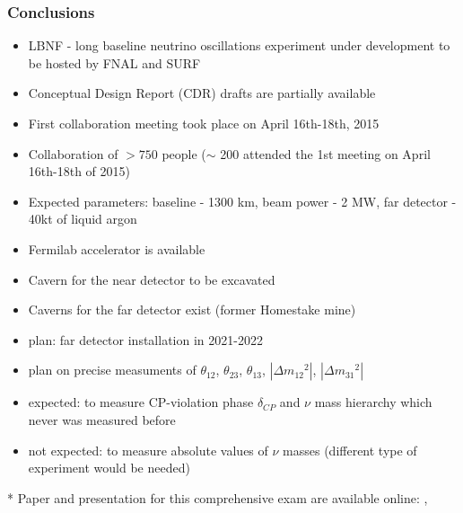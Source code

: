 \documentclass{beamer}
\begin{document}
\begin{frame}\frametitle{Conclusions}
  \scriptsize
  \begin{itemize}

     \item LBNF - long baseline neutrino oscillations experiment under development to be hosted by FNAL and SURF 
     \item Conceptual Design Report (CDR) drafts are partially available
     \item First collaboration meeting took place on April 16th-18th, 2015
     \item Collaboration of $>750$ people ($\sim$ 200 attended the 1st meeting on April 16th-18th of 2015)
     \item Expected parameters: baseline - 1300 km, beam power - 2 MW, far detector - 40kt of liquid argon
     \item Fermilab accelerator is available 
     \item Cavern for the near detector to be excavated
     \item Caverns for the far detector exist (former Homestake mine)
     \item plan: far detector installation in 2021-2022
     \item plan on precise measuments of $\theta_{12}$, $\theta_{23}$, $\theta_{13}$, $|\Delta{m_{12}}^2|$, $|\Delta{m_{31}}^2|$
     \item expected: to measure CP-violation phase $\delta_{CP}$ and $\nu$ mass hierarchy which never was measured before
     \item not expected: to measure absolute values of $\nu$ masses (different type of experiment would be needed)
  \end{itemize}
  \tiny
  * Paper and presentation for this comprehensive exam are available online: \cite{ref_my_paper}, \cite{ref_my_presentation}
\end{frame}



\end{document}
